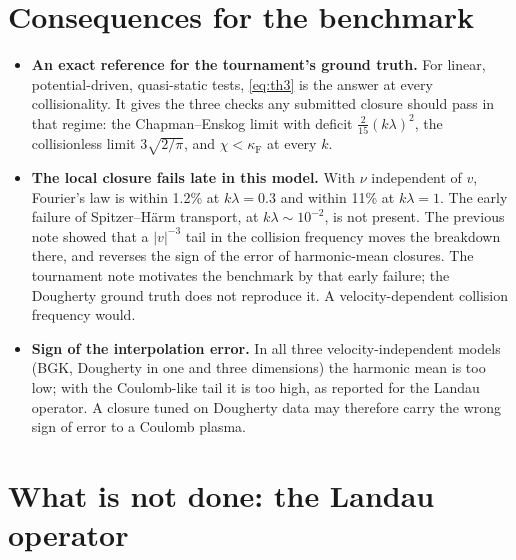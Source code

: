 \documentclass[11pt]{article}
\theoremstyle{remark}
\begin{document}
\section{Consequences for the benchmark}
\label{sec:impl}

\begin{itemize}
  \item \textbf{An exact reference for the tournament's ground truth.} For
    linear, potential-driven, quasi-static tests, \eqref{eq:th3} is the
    answer at every collisionality. It gives the three checks any submitted
    closure should pass in that regime: the Chapman--Enskog limit with
    deficit $\tfrac{2}{15}(k\lambda)^2$, the collisionless limit
    $3\sqrt{2/\pi}$, and $\chi<\kappa_{\mathrm F}$ at every $k$.
  \item \textbf{The local closure fails late in this model.} With $\nu$
    independent of $v$, Fourier's law is within 1.2\% at $k\lambda=0.3$ and
    within 11\% at $k\lambda=1$. The early failure of Spitzer--H\"arm
    transport, at $k\lambda\sim10^{-2}$, is not present. The previous note
    showed that a $|v|^{-3}$ tail in the collision frequency moves the
    breakdown there, and reverses the sign of the error of harmonic-mean
    closures. The tournament note motivates the benchmark by that early
    failure; the Dougherty ground truth does not reproduce it. A
    velocity-dependent collision frequency would.
  \item \textbf{Sign of the interpolation error.} In all three
    velocity-independent models (BGK, Dougherty in one and three dimensions)
    the harmonic mean is too low; with the Coulomb-like tail it is too high,
    as reported for the Landau operator. A closure tuned on Dougherty data
    may therefore carry the wrong sign of error to a Coulomb plasma.
\end{itemize}

\section{What is not done: the Landau operator}
\label{sec:landau}
\end{document}
